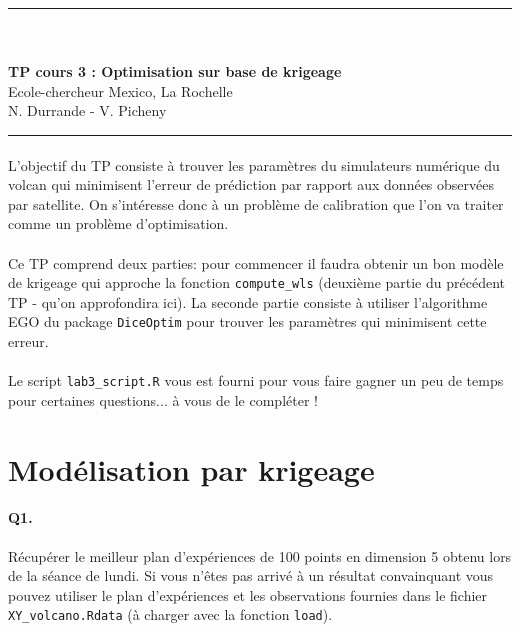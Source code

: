 \documentclass[12pt]{scrartcl}
\begin{document}
\begin{center}
	\rule{\textwidth}{1pt}
	\\ \ \\
	{\LARGE \textbf{TP cours 3 : Optimisation sur base de krigeage}}\\
	\vspace{3mm}
	{\large Ecole-chercheur Mexico, La Rochelle \\ \vspace{3mm}}
	{\normalsize N. Durrande - V. Picheny}\\
	\vspace{3mm}
	\rule{\textwidth}{1pt}
	\vspace{5mm}
\end{center}
\paragraph{}
L'objectif du TP consiste à trouver les paramètres du simulateurs numérique du volcan qui minimisent l'erreur de prédiction par rapport aux données observées par satellite. On s'intéresse donc à un problème de calibration que l'on va traiter comme un problème d'optimisation.

\paragraph{}
Ce TP comprend deux parties: pour commencer il faudra obtenir un bon modèle de krigeage qui approche la fonction \texttt{compute\_wls} (deuxième partie du précédent TP - qu'on approfondira ici). 
La seconde partie consiste à utiliser l'algorithme EGO du package \texttt{DiceOptim} pour trouver les paramètres qui minimisent cette erreur.

\paragraph{}
Le script \texttt{lab3\_script.R} vous est fourni pour vous faire gagner un peu de temps pour certaines questions... à vous de le compléter !
\section{Modélisation par krigeage}

\paragraph{Q1.} Récupérer le meilleur plan d'expériences de 100 points en dimension 5 obtenu lors de la séance de lundi. 
Si vous n'êtes pas arrivé à un résultat convainquant vous pouvez utiliser le plan d'expériences et les observations fournies dans le fichier \texttt{XY\_volcano.Rdata} (à charger avec la fonction \texttt{load}).
\end{document}
